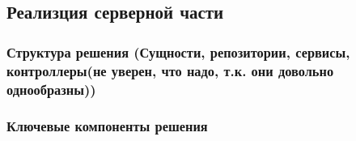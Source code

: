 \subsection{Реализция серверной части}

\subsubsection{Структура решения (Сущности, репозитории, сервисы, контроллеры(не уверен, что надо, т.к. они довольно однообразны))}

\subsubsection{Ключевые компоненты решения}
